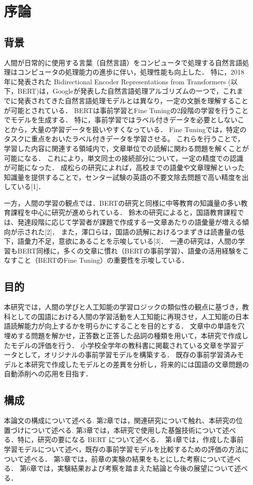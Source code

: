 \chapter{序論\label{c1}}

\section{背景}
人間が日常的に使用する言葉（自然言語）をコンピュータで処理する自然言語処理はコンピュータの処理能力の進歩に伴い，処理性能も向上した．
特に，2018年に発表された Bidirectional Encoder Representations from Transformers (以下，BERT)は，Googleが発表した自然言語処理アルゴリズムの一つで，これまでに発表されてきた自然言語処理モデルとは異なり，一定の文脈を理解することが可能とされている．
BERTは事前学習とFine Tuningの2段階の学習を行うことでモデルを生成する．
特に，事前学習ではラベル付きデータを必要としないことから，大量の学習データを扱いやすくなっている．
Fine Tuningでは，特定のタスクに重点をおいたラベル付きデータを学習させる。
これらを行うことで，学習した内容に関連する領域内で，文章単位での読解に関わる問題を解くことが可能になる．
これにより，単文同士の接続部分について，一定の精度での認識が可能になった．
成松らの研究によれば，高校までの語彙や文章理解といった知識量を提供することで，センター試験の英語の不要文除去問題で高い精度を出している[1]．\par
一方，人間の学習の観点では．BERTの研究と同様に中等教育の知識量の多い教育課程を中心に研究が進められている．
鈴木の研究によると，国語教育課程では、発達段階に応じて学習者が課題で作成する一文章あたりの語彙量が増える傾向が示された[2]．
また，澤口らは，国語の読解におけるつまずきは読書量の低下，語彙力不足，意欲にあることを示唆している[3]．
一連の研究は，人間の学習もBERT同様に，多くの文章に慣れ（BERTの事前学習）、語彙の活用経験をこなすこと（BERTのFine Tuning）の重要性を示唆している．

\section{目的}
本研究では，人間の学びと人工知能の学習ロジックの類似性の観点に基づき，教科としての国語における人間の学習活動を人工知能に再現させ，人工知能の日本語読解能力が向上するかを明らかにすることを目的とする．
文章中の単語を穴埋めする問題を解かせ，正答数と正答した品詞の種類を用いて，本研究で作成したモデルの評価を行う．
小学校全学年の教科書に掲載されている文章を学習データとして，オリジナルの事前学習モデルを構築する．
既存の事前学習済みモデルと本研究で作成したモデルとの差異を分析し，将来的には国語の文章問題の自動添削への応用を目指す．

\section{構成}
本論文の構成について述べる.
第2章では，関連研究について触れ、本研究の位置づけについて述べる.
第3章では，本研究で使用した基盤技術について述べる．特に，研究の要になる BERT について述べる．
第4章では，作成した事前学習モデルについて述べ，既存の事前学習モデルを比較するための評価の方法について述べる．
第5章では，前章の実験の結果をもとにした考察について述べる．
第6章では，実験結果および考察を踏まえた結論と今後の展望について述べる．
